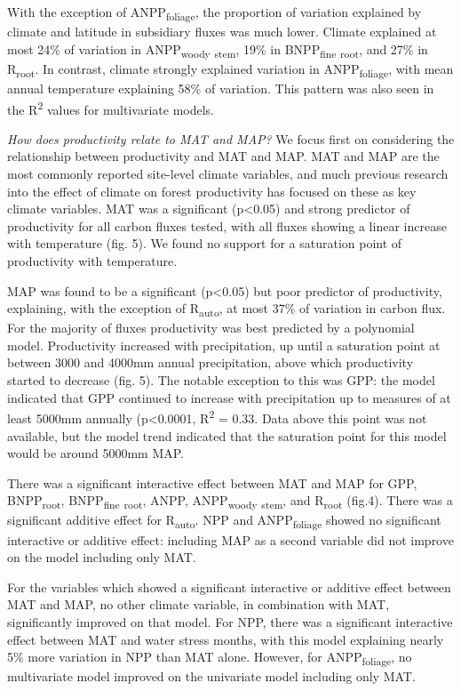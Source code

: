 \documentclass[]{article}
\begin{document}
With the exception of ANPP\textsubscript{foliage}, the proportion of
variation explained by climate and latitude in subsidiary fluxes was
much lower. Climate explained at most 24\% of variation in
ANPP\textsubscript{woody} \textsubscript{stem}, 19\% in
BNPP\textsubscript{fine} \textsubscript{root}, and 27\% in
R\textsubscript{root}. In contrast, climate strongly explained variation
in ANPP\textsubscript{foliage}, with mean annual temperature explaining
58\% of variation. This pattern was also seen in the
R\textsuperscript{2} values for multivariate models.

\emph{How does productivity relate to MAT and MAP?} We focus first on
considering the relationship between productivity and MAT and MAP. MAT
and MAP are the most commonly reported site-level climate variables, and
much previous research into the effect of climate on forest productivity
has focused on these as key climate variables. MAT was a significant
(p\textless{}0.05) and strong predictor of productivity for all carbon
fluxes tested, with all fluxes showing a linear increase with
temperature (fig. 5). We found no support for a saturation point of
productivity with temperature.

MAP was found to be a significant (p\textless{}0.05) but poor predictor
of productivity, explaining, with the exception of
R\textsubscript{auto}, at most 37\% of variation in carbon flux. For the
majority of fluxes productivity was best predicted by a polynomial
model. Productivity increased with precipitation, up until a saturation
point at between 3000 and 4000mm annual precipitation, above which
productivity started to decrease (fig. 5). The notable exception to this
was GPP: the model indicated that GPP continued to increase with
precipitation up to measures of at least 5000mm annually
(p\textless{}0.0001, R\textsuperscript{2} = 0.33. Data above this point
was not available, but the model trend indicated that the saturation
point for this model would be around 5000mm MAP.

There was a significant interactive effect between MAT and MAP for GPP,
BNPP\textsubscript{root}, BNPP\textsubscript{fine} \textsubscript{root},
ANPP, ANPP\textsubscript{woody} \textsubscript{stem}, and
R\textsubscript{root} (fig.4). There was a significant additive effect
for R\textsubscript{auto}. NPP and ANPP\textsubscript{foliage} showed no
significant interactive or additive effect: including MAP as a second
variable did not improve on the model including only MAT.

For the variables which showed a significant interactive or additive
effect between MAT and MAP, no other climate variable, in combination
with MAT, significantly improved on that model. For NPP, there was a
significant interactive effect between MAT and water stress months, with
this model explaining nearly 5\% more variation in NPP than MAT alone.
However, for ANPP\textsubscript{foliage}, no multivariate model improved
on the univariate model including only MAT.
\end{document}
